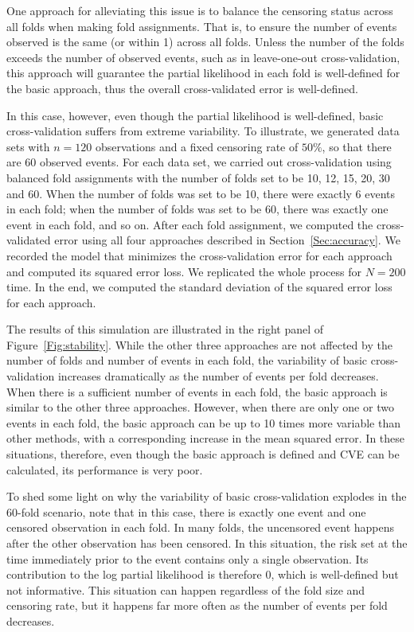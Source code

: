 One approach for alleviating this issue is to balance the censoring status across all folds when making fold assignments. That is, to ensure the number of events observed is the same (or within 1) across all folds. Unless the number of the folds exceeds the number of observed events, such as in leave-one-out cross-validation, this approach will guarantee the partial likelihood in each fold is well-defined for the basic approach, thus the overall cross-validated error is well-defined. 

In this case, however, even though the partial likelihood is well-defined, basic cross-validation suffers from extreme variability.  To illustrate, we generated data sets with $n = 120$ observations and a fixed censoring rate of $50\%$, so that there are 60 observed events. For each data set, we carried out cross-validation using balanced fold assignments with the number of folds set to be 10, 12, 15, 20, 30 and 60. When the number of folds was set to be 10, there were exactly 6 events in each fold; when the number of folds was set to be 60, there was exactly one event in each fold, and so on. After each fold assignment, we computed the cross-validated error using all four approaches described in Section~\ref{Sec:accuracy}. We recorded the model that minimizes the cross-validation error for each approach and computed its squared error loss. We replicated the whole process for $N = 200$ time. In the end, we computed the standard deviation of the squared error loss for each approach. 

The results of this simulation are illustrated in the right panel of Figure~\ref{Fig:stability}. While the other three approaches are not affected by the number of folds and number of events in each fold, the variability of basic cross-validation increases dramatically as the number of events per fold decreases. When there is a sufficient number of events in each fold, the basic approach is similar to the other three approaches. However, when there are only one or two events in each fold, the basic approach can be up to 10 times more variable than other methods, with a corresponding increase in the mean squared error.  In these situations, therefore, even though the basic approach is defined and CVE can be calculated, its performance is very poor.

To shed some light on why the variability of basic cross-validation explodes in the 60-fold scenario, note that in this case, there is exactly one event and one censored observation in each fold. In many folds, the uncensored event happens after the other observation has been censored. In this situation, the risk set at the time immediately prior to the event contains only a single observation. Its contribution to the log partial likelihood is therefore 0, which is well-defined but not informative. This situation can happen regardless of the fold size and censoring rate, but it happens far more often as the number of events per fold decreases.

